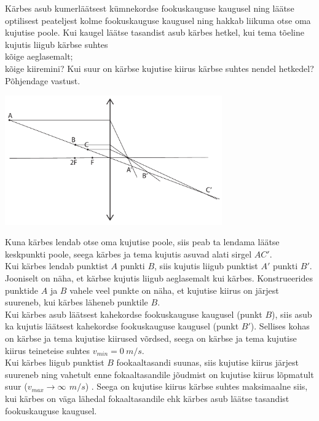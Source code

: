 \setAuthor{}

Kärbes asub kumerläätsest kümnekordse fookuskauguse kaugusel ning läätse optilisest peateljest kolme fookuskauguse kaugusel ning hakkab liikuma otse oma kujutise poole. Kui kaugel läätse tasandist asub kärbes hetkel, kui tema tõeline kujutis liigub kärbse suhtes\\
\osa kõige aeglasemalt;\\
\osa kõige kiiremini? Kui suur on kärbse kujutise kiirus kärbse suhtes nendel hetkedel? Põhjendage vastust. 

\hint

\solu
\vspace{-20pt}
  \begin{center}
    \includegraphics[width=0.7\textwidth]{2019-v2g-03-sol.pdf}
  \end{center}
  \vspace{-20pt}


Kuna kärbes lendab otse oma kujutise poole, siis peab ta lendama läätse keskpunkti poole, seega kärbes ja tema kujutis asuvad alati sirgel $AC'$. \\ 
Kui kärbes lendab punktist $A$ punkti $B$, siis kujutis liigub punktist $A'$ punkti $B'$. Jooniselt on näha, et kärbse kujutis liigub aeglasemalt kui kärbes. Konstrueerides punktide $A$ ja $B$ vahele veel punkte on näha, et kujutise kiirus on järjest suureneb, kui kärbes läheneb punktile $B$. \\
Kui kärbes asub läätsest kahekordse fookuskauguse kaugusel (punkt $B$), siis asub ka kujutis läätsest kahekordse fookuskauguse kaugusel (punkt $B'$).  Sellises kohas on kärbse ja tema kujutise kiirused võrdsed, seega on kärbse ja tema kujutise kiirus teineteise suhtes $v_{min} = \SI{0}{m/s}$. \\
Kui kärbes liigub punktist $B$ fookaaltasandi suunas, siis kujutise kiirus järjest suureneb  ning vahetult enne fokaaltasandile jõudmist on kujutise kiirus lõpmatult suur ($v_{max} \rightarrow \infty\SI{}{\,m/s}$) . Seega on kujutise kiirus kärbse suhtes maksimaalne siis, kui kärbes on väga lähedal fokaaltasandile ehk kärbes asub läätse tasandist fookuskauguse kaugusel. 
\probend